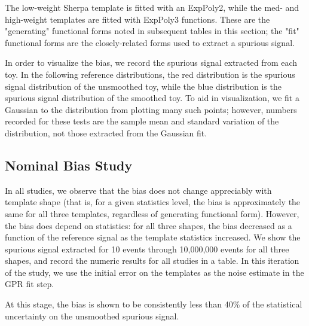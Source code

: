 The low-weight Sherpa template is fitted with an ExpPoly2, while the med- and high-weight templates are fitted with ExpPoly3 functions. These are the "generating" functional forms noted in subsequent tables in this section; the "fit" functional forms are the closely-related forms used to extract a spurious signal.

In order to visualize the bias, we record the spurious signal extracted from each toy. In the following reference distributions, the red distribution is the spurious signal distribution of the unsmoothed toy, while the blue distribution is the spurious signal distribution of the smoothed toy. To aid in visualization, we fit a Gaussian to the distribution from plotting many such points; however, numbers recorded for these tests are the sample mean and standard variation of the distribution, not those extracted from the Gaussian fit.

\subsection{Nominal Bias Study}

In all studies, we observe that the bias does not change appreciably with template shape (that is, for a given statistics level, the bias is approximately the same for all three templates, regardless of generating functional form). However, the bias does depend on statistics: for all three shapes, the bias decreased as a function of the reference signal as the template statistics increased. We show the spurious signal extracted for 10 events through 10,000,000 events for all three shapes, and record the numeric results for all studies in a table. In this iteration of the study, we use the initial error on the templates as the noise estimate in the GPR fit step. 

At this stage, the bias is shown to be consistently less than 40\% of the statistical uncertainty on the unsmoothed spurious signal.

